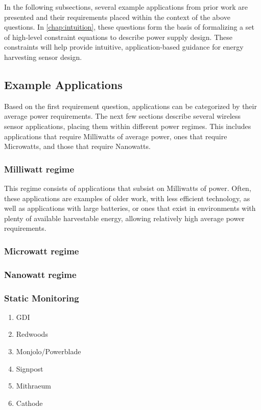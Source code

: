 \noindent In the following subsections, several example applications from prior work are presented and their requirements placed within the context of the above questions. In \cref{chap:intuition}, these questions form the basis of formalizing a set of high-level constraint equations to describe power supply design.
These constraints will help provide intuitive, application-based guidance for energy harvesting sensor design.

\subsection{Example Applications}
Based on the first requirement question, applications can be categorized by their average power requirements. The next few sections describe several wireless sensor applications, placing them within different power regimes. This includes applications that require Milliwatts of average power, ones that require Microwatts, and those that require Nanowatts.

\subsubsection{Milliwatt regime}
This regime consists of applications that subsist on Milliwatts of power. Often, these applications are examples of older work, with less efficient technology, as well as applications with large batteries, or ones that exist in environments with plenty of available harvestable energy, allowing relatively high average power requirements.

\subsubsection{Microwatt regime}
\subsubsection{Nanowatt regime}
\subsubsection{Static Monitoring}
\begin{enumerate}
    \item GDI ~\cite{mainwaring2002wireless}
    \item Redwoods ~\cite{tolle2005macroscope}
    \item Monjolo/Powerblade
    \item Signpost ~\cite{adkins2018signpost}
    \item Mithraeum ~\cite{afanasov2020battery}
    \item Cathode ~\cite{jagtap2021repurposing}
\end{enumerate}
